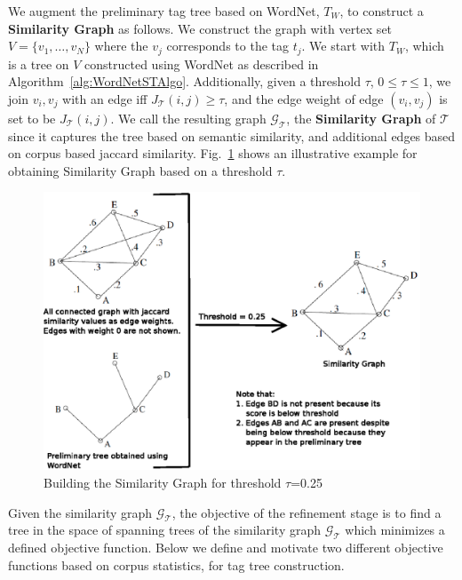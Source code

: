 We augment the preliminary tag tree based on WordNet, $T_W$, to construct a \textbf{Similarity Graph} as follows. We construct the graph with vertex set $V = \{v_1,\ldots, v_N\}$ where the $v_j$ corresponds to the tag $t_j$. We start with $T_W$, which is a tree on $V$ constructed using WordNet as described in Algorithm~\ref{alg:WordNetSTAlgo}. Additionally, given a threshold $\tau$, $0\leq \tau \leq 1$, we join $v_i, v_j$ with an edge iff $J_{\mathcal{T}}(i,j) \geq \tau$, and the edge weight of edge $(v_i,v_j)$ is set to be $J_{\mathcal{T}}(i,j)$.  We call the resulting graph $\mathcal{G_T}$, the {\bf Similarity Graph} of $\mathcal{T}$ since it captures the tree based on semantic similarity, and additional edges based on corpus based jaccard similarity. Fig.~\ref{fig:sim} shows an illustrative example for obtaining Similarity Graph based on a threshold $\tau$.
\begin{figure}[h]
\centering
\includegraphics[width=0.8\linewidth]{TagTree/CreatingSimGraph}
\caption{Building the Similarity Graph for threshold $\tau$=0.25} 
\label{fig:sim}
\end{figure}
Given the similarity graph $\mathcal{G_T}$, the objective of the refinement stage is to find a tree in the space of spanning trees of the similarity graph $\mathcal{G_T}$ which minimizes a defined objective function. Below we define and motivate two different objective functions based on corpus statistics, for tag tree construction. 

